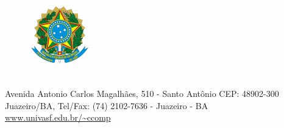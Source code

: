 \documentclass[
	12pt,				%
	openany,			%
	oneside, 			%
	a4paper,			%
	chapter=TITLE,		%
	section=TITLE,		%
	sumario=tradicional,	
	english,			%
	brazil,				%
	]{abntex2}
\begin{document}
	\frenchspacing %
	
    \setlength{\belowcaptionskip}{0pt}
    \setlength{\abovecaptionskip}{0pt}
    \setlength{\intextsep}{-18pt}
        \begin{figure}[h]
    		\begin{center}
    		   \includegraphics[scale=0.8]{img/brasao_brasil_m.png}
    		\end{center}
    	\end{figure}
        \center
    	{\textbf{\ABNTEXchapterfont\imprimirinstituicao}}
    	\\
        Avenida Antonio Carlos Magalhães, 510 - Santo Antônio CEP: 48902-300 \\
        Juazeiro/BA, Tel/Fax: (74) 2102-7636 - Juazeiro - BA \\
        \url{www.univasf.edu.br/~ccomp}
        
    	\begin{mdframed}[roundcorner=10pt]
    	    \begin{minipage}[t][3\height][c]{\dimexpr\textwidth-1\fboxsep-2\fboxrule\relax}
                \centering
                \ABNTEXchapterfont\large\imprimirtipotrabalho
            \end{minipage}
        \end{mdframed}
        
\end{document}

